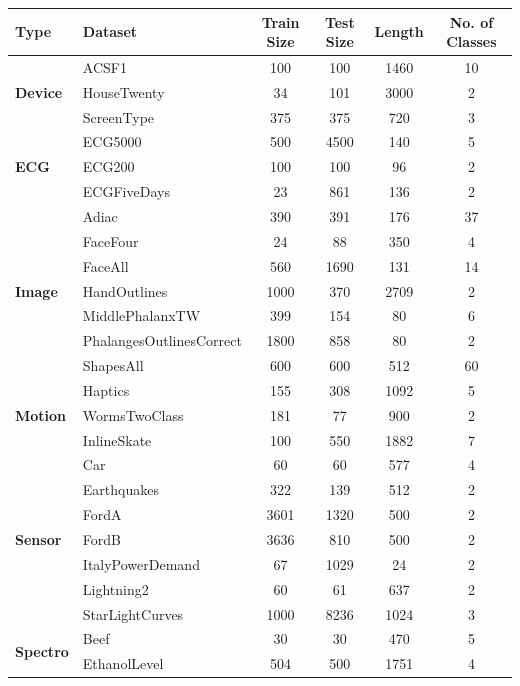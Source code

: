 \begin{table}[h!]
\centering
\vspace{0.2cm}
\begin{adjustbox}{max width=\textwidth}
\begin{tabular}{llcccc}
\toprule
\textbf{Type} & \textbf{Dataset} & \textbf{Train Size} & \textbf{Test Size} & \textbf{Length} & \textbf{No. of Classes} \\
\midrule
\multirow{3}{*}{\textbf{Device}} 
& ACSF1 & 100 & 100 & 1460 & 10 \\
& HouseTwenty & 34 & 101 & 3000 & 2 \\
& ScreenType & 375 & 375 & 720 & 3 \\
\midrule
\multirow{3}{*}{\textbf{ECG}} 
& ECG5000 & 500 & 4500 & 140 & 5 \\
& ECG200 & 100 & 100 & 96 & 2 \\
& ECGFiveDays & 23 & 861 & 136 & 2 \\
\midrule
\multirow{7}{*}{\textbf{Image}} 
& Adiac & 390 & 391 & 176 & 37  \\
& FaceFour & 24 & 88 & 350 & 4  \\
& FaceAll & 560 & 1690 & 131 & 14 \\
& HandOutlines & 1000 & 370 & 2709 & 2 \\
& MiddlePhalanxTW & 399 & 154 & 80 & 6 \\
& PhalangesOutlinesCorrect & 1800 & 858 & 80 & 2 \\
& ShapesAll & 600 & 600 & 512 & 60 \\
\midrule
\multirow{3}{*}{\textbf{Motion}} 
& Haptics & 155 & 308 & 1092 & 5 \\
& WormsTwoClass & 181 & 77 & 900 & 2  \\
& InlineSkate & 100 & 550 & 1882 & 7  \\
\midrule
\multirow{7}{*}{\textbf{Sensor}} 
& Car & 60 & 60 & 577 & 4 \\
& Earthquakes & 322 & 139 & 512 & 2 \\
& FordA & 3601 & 1320 & 500 & 2  \\
& FordB & 3636 & 810 & 500 & 2  \\
& ItalyPowerDemand & 67 & 1029 & 24 & 2  \\
& Lightning2 & 60 & 61 & 637 & 2  \\
& StarLightCurves & 1000 & 8236 & 1024 & 3  \\
\midrule
\multirow{5}{*}{\textbf{Spectro}} 
& Beef & 30 & 30 & 470 & 5  \\
& EthanolLevel & 504 & 500 & 1751 & 4  \\

\end{tabular}
\end{adjustbox}
\end{table}
